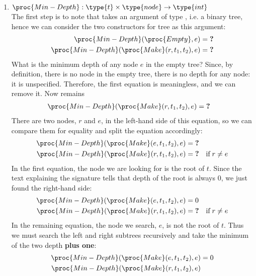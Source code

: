 \begin{enumerate}
     \item \(\proc{Min-Depth}: \type{t} \times \type{node} \rightarrow
       \type{int}\)\\
     The first step is to note that  takes an argument
     of type , i.e. a binary tree, hence we can consider the
     two constructors for tree as this argument:
     \begin{align*}
       \proc{Min-Depth} (\proc{Empty}, e) &= \textbf{?}\\
       \proc{Min-Depth} (\proc{Make} (r, t_1, t_2), e) &= \textbf{?}
     \end{align*}
     What is the minimum depth of any node \(e\) in the empty
       tree?  Since, by definition, there is no node in the empty
       tree, there is no depth for any node: it is
       unspecified. Therefore, the first equation is meaningless, and
       we can remove it. Now remains
     \begin{align*}
       \proc{Min-Depth} (\proc{Make} (r, t_1, t_2), e) &= \textbf{?}
     \end{align*}
     There are two nodes, \(r\) and \(e\), in the left-hand side of
     this equation, so we can compare them for equality and split the
     equation accordingly:
     \begin{align*}
          \proc{Min-Depth} (\proc{Make} (e, t_1, t_2), e) 
       &= \textbf{?}\\
          \proc{Min-Depth} (\proc{Make} (r, t_1, t_2), e) 
       &= \textbf{?}
       & \text{if} \; r \neq e
     \end{align*}
     In the first equation, the node we are looking for is the root of
     \(t\). Since the text explaining the signature tells that depth
     of the root is always 0, we just found the right-hand side:
     \begin{align*}
          \proc{Min-Depth} (\proc{Make} (e, t_1, t_2), e) 
       &= 0\\
          \proc{Min-Depth} (\proc{Make} (r, t_1, t_2), e) 
       &= \textbf{?}
       & \text{if} \; r \neq e
     \end{align*}
     In the remaining equation, the node we search, \(e\), is not the
     root of \(t\). Thus we must search the left and right subtrees
     recursively and take the minimum of the two depth \textbf{plus
       one}:
     \begin{align*}
          \proc{Min-Depth} (\proc{Make} (e, t_1, t_2), e) 
       &= 0\\
          \proc{Min-Depth} (\proc{Make} (r, t_1, t_2), e) 

\end{align*}
\end{enumerate}
